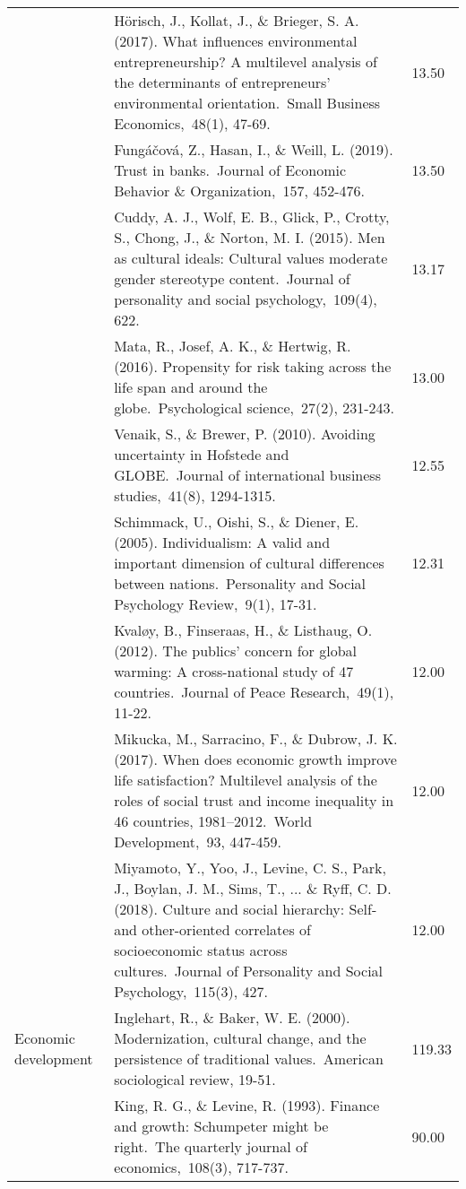 \documentclass[
  man,floatsintext]{apa6}
\begin{document}
\begin{center}
\begin{ThreePartTable}
{\begin{longtable}{m{2cm}m{11cm}m{2cm}}
 & Hörisch, J., Kollat, J., \& Brieger, S. A. (2017). What influences environmental entrepreneurship? A multilevel analysis of the determinants of entrepreneurs’ environmental orientation. Small Business Economics, 48(1), 47-69. & 13.50\\
 & Fungáčová, Z., Hasan, I., \& Weill, L. (2019). Trust in banks. Journal of Economic Behavior \& Organization, 157, 452-476. & 13.50\\
 & Cuddy, A. J., Wolf, E. B., Glick, P., Crotty, S., Chong, J., \& Norton, M. I. (2015). Men as cultural ideals: Cultural values moderate gender stereotype content. Journal of personality and social psychology, 109(4), 622. & 13.17\\
 & Mata, R., Josef, A. K., \& Hertwig, R. (2016). Propensity for risk taking across the life span and around the globe. Psychological science, 27(2), 231-243. & 13.00\\
 & Venaik, S., \& Brewer, P. (2010). Avoiding uncertainty in Hofstede and GLOBE. Journal of international business studies, 41(8), 1294-1315. & 12.55\\
 & Schimmack, U., Oishi, S., \& Diener, E. (2005). Individualism: A valid and important dimension of cultural differences between nations. Personality and Social Psychology Review, 9(1), 17-31. & 12.31\\
 & Kvaløy, B., Finseraas, H., \& Listhaug, O. (2012). The publics’ concern for global warming: A cross-national study of 47 countries. Journal of Peace Research, 49(1), 11-22. & 12.00\\
 & Mikucka, M., Sarracino, F., \& Dubrow, J. K. (2017). When does economic growth improve life satisfaction? Multilevel analysis of the roles of social trust and income inequality in 46 countries, 1981–2012. World Development, 93, 447-459. & 12.00\\
 & Miyamoto, Y., Yoo, J., Levine, C. S., Park, J., Boylan, J. M., Sims, T., ... \& Ryff, C. D. (2018). Culture and social hierarchy: Self-and other-oriented correlates of socioeconomic status across cultures. Journal of Personality and Social Psychology, 115(3), 427. & 12.00\\
Economic development & Inglehart, R., \& Baker, W. E. (2000). Modernization, cultural change, and the persistence of traditional values. American sociological review, 19-51. & 119.33\\
 & King, R. G., \& Levine, R. (1993). Finance and growth: Schumpeter might be right. The quarterly journal of economics, 108(3), 717-737. & 90.00\\

\end{longtable}}
\end{ThreePartTable}
\end{center}
\end{document}
